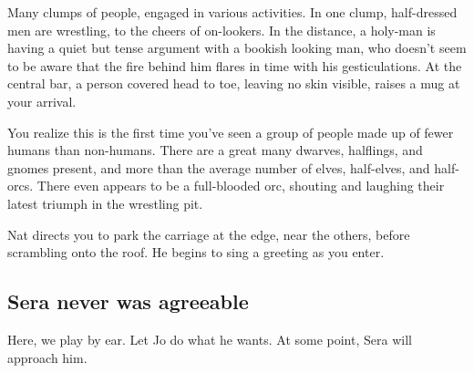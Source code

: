 \begin{multicols}{2}
\begin{aloud}
  Many clumps of people, engaged in various activities.
  In one clump, half-dressed men are wrestling, to the cheers of on-lookers.
  In the distance, a holy-man is having a quiet but tense argument with a bookish looking man, who doesn't seem to be aware that the fire behind him flares in time with his gesticulations.
  At the central bar, a person covered head to toe, leaving no skin visible, raises a mug at your arrival.

  You realize this is the first time you've seen a group of people made up of fewer humans than non-humans.
  There are a great many dwarves, halflings, and gnomes present, and more than the average number of elves, half-elves, and half-orcs.
  There even appears to be a full-blooded orc, shouting and laughing their latest triumph in the wrestling pit.

  Nat directs you to park the carriage at the edge, near the others, before scrambling onto the roof.
  He begins to sing a greeting as you enter.
  \end{aloud}

\subsection{Sera never was agreeable}

  Here, we play by ear.
  Let Jo do what he wants.
  At some point, Sera will approach him.

\end{multicols}